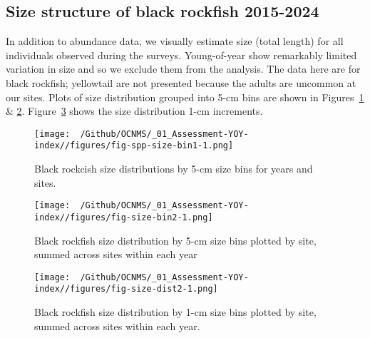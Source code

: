 \documentclass[
  letterpaper,
  DIV=11,
  numbers=noendperiod]{scrartcl}
\begin{document}
\newpage

\hypertarget{size-structure-of-black-rockfish-2015-2024}{%
\subsection{Size structure of black rockfish
2015-2024}\label{size-structure-of-black-rockfish-2015-2024}}

In addition to abundance data, we visually estimate size (total length)
for all individuals observed during the surveys. Young-of-year show
remarkably limited variation in size and so we exclude them from the
analysis. The data here are for black rockfish; yellowtail are not
presented because the adults are uncommon at our sites. Plots of size
distribution grouped into 5-cm bins are shown in
Figures~\ref{fig-spp-size-bin1} \& \ref{fig-size-bin2}.
Figure~\ref{fig-size-dist2} shows the size distribution 1-cm increments.

\begin{figure}[H]

{\centering \texttt{[image: ~/Github/OCNMS/\_01\_Assessment-YOY-index//figures/fig-spp-size-bin1-1.png]}

}

\caption{\label{fig-spp-size-bin1}Black rockcish size distributions by
5-cm size bins for years and sites.}

\end{figure}

\newpage

\begin{figure}[H]

{\centering \texttt{[image: ~/Github/OCNMS/\_01\_Assessment-YOY-index//figures/fig-size-bin2-1.png]}

}

\caption{\label{fig-size-bin2}Black rockfish size distribution by 5-cm
size bins plotted by site, summed across sites within each year}

\end{figure}

\newpage

\begin{figure}[H]

{\centering \texttt{[image: ~/Github/OCNMS/\_01\_Assessment-YOY-index//figures/fig-size-dist2-1.png]}

}

\caption{\label{fig-size-dist2}Black rockfish size distribution by 1-cm
size bins plotted by site, summed across sites within each year.}

\end{figure}
\end{document}
